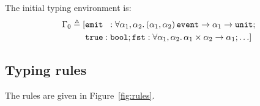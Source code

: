 \documentclass[9pt,preprint]{sigplanconf}
\newcommand{\deq}{\triangleq}
\begin{document}
The initial typing environment is: 
\begin{align*}
\Gamma_0 \deq [
 &\eemit{}{} : \forall  \rtvar_1, \rtvar_2. \, 
        \rtarrow{ \rtsig{\rtvar_1}{\rtvar_2} }{\rtarrow{\rtvar_1}{\unit{}} }; \\
        &\mathtt{true} : \mathtt{bool};
              \mathtt{fst} : \forall \rtvar_1, \rtvar_2.\, \rtarrow{\rtprod{\rtvar_1}{\rtvar_2}}{\rtvar_1};  \ldots ]
\end{align*}

\subsection{Typing rules}

\begin{figure*}
\begin{small}

\end{small}

\caption{Type-and-effect rules}
\label{fig:rules}
\end{figure*}

The rules are given in Figure~\ref{fig:rules}.
\end{document}
